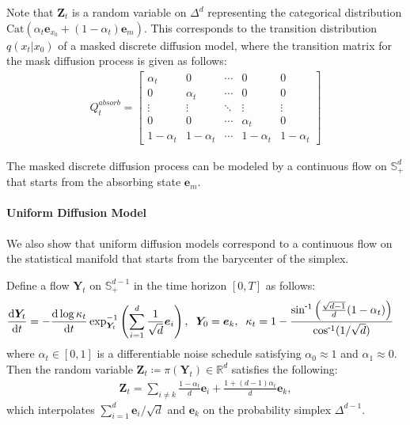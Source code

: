 Note that $\bm{Z}_t$ is a random variable on  $\Delta^{d}$ representing the categorical distribution $\text{Cat}(\alpha_t\bm{e}_{x_0} + (1-\alpha_t)\bm{e}_m)$.
This corresponds to the transition distribution $q(x_t|x_0)$ of a masked discrete diffusion model, where the transition matrix for the mask diffusion process is given as follows: 
\begin{align}
    Q^{absorb}_t = \begin{bmatrix}
        \alpha_t & 0 & \cdots & 0 & 0 \\
        0 & \alpha_t & \cdots & 0 & 0 \\
        \vdots & \vdots & \ddots & \vdots & \vdots \\ 
        0 & 0 & \cdots & \alpha_t & 0 \\
        1-\alpha_t & 1-\alpha_t & \cdots & 1-\alpha_t & 1-\alpha_t
    \end{bmatrix}
\end{align}

\begin{tcolorbox}
[colback=white,colframe=blue!30!white]
\begin{corollary}
The masked discrete diffusion process can be modeled by a continuous flow on $\mathbb{S}^{d}_{+}$ that starts from the absorbing state $\bm{e}_m$.
\end{corollary}
\end{tcolorbox}


\paragraph{Uniform Diffusion Model}
We also show that uniform diffusion models correspond to a continuous flow on the statistical manifold that starts from the barycenter of the simplex.

\begin{tcolorbox}
[colback=white,colframe=blue!30!white]
\begin{proposition}
\label{prop:mask_flow}
Define a flow $\bm{Y}_t$ on $\mathbb{S}^{d-1}_{+}$ in the time horizon $[0,T]$ as follows:
\begin{align}
    &\frac{\mathrm{d}\bm{Y}_t}{\mathrm{d}t} = -\frac{\mathrm{d}\log \kappa_t}{\mathrm{d}t}
    \exp^{-1}_{\bm{Y}_t} \left(
        \sum^{d}_{i=1} \frac{1}{\sqrt{d}}\bm{e}_i 
    \right), \;\; 
    \bm{Y}_0=\bm{e}_k, \;\;
    \kappa_t = 1 - \frac{\invsin \left( \frac{\sqrt{d-1}}{d}(1-\alpha_t) \right)}{\invcos (1/\sqrt{d})}
\label{eq:uniform_flow}
\end{align}
where $\alpha_t\in[0,1]$ is a differentiable noise schedule satisfying $\alpha_0\approx1$ and $\alpha_1\approx0$.
Then the random variable $\bm{Z}_t\coloneqq \pi\left(\bm{Y}_t \right)\in\mathbb{R}^{d}$ satisfies the following:
\begin{align}
    \bm{Z}_t = \sum_{i\neq k}\frac{1-\alpha_t}{d}\bm{e}_i + \frac{1 + (d-1)\alpha_t}{d}\bm{e}_k ,
\end{align}
which interpolates $\sum^d_{i=1} \bm{e}_i/\sqrt{d}$ and $\bm{e}_k$ on the probability simplex $\Delta^{d-1}$.
\end{proposition}
\end{tcolorbox}

